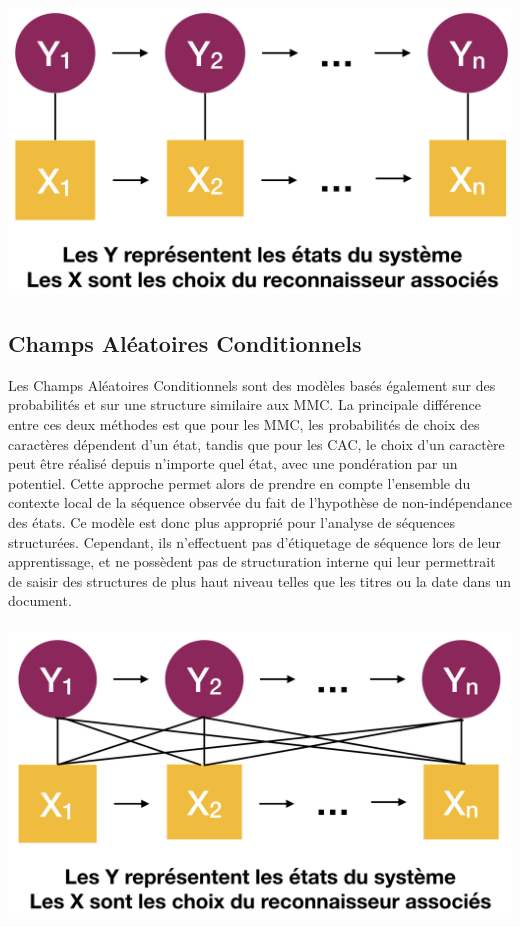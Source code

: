 \paragraph{}
\begin{mdframed}[frametitle={Schéma de transition et d'observation d'un MMC}, innerbottommargin=10]
\begin{center}
\includegraphics[width=0.6\linewidth]{mmc.png}
\end{center}
\end{mdframed}

\subsection{Champs Aléatoires Conditionnels}

Les Champs Aléatoires Conditionnels sont des modèles basés également sur des probabilités et
sur une structure similaire aux MMC. La principale différence entre ces deux méthodes est que pour les MMC,
les probabilités de choix des caractères dépendent d'un état, tandis que pour les CAC, le choix d'un
caractère peut être réalisé depuis n'importe quel état, avec une pondération par un potentiel.
Cette approche permet alors de prendre en compte l'ensemble du contexte local de la séquence observée
du fait de l'hypothèse de non-indépendance des états. Ce modèle est donc plus approprié pour l'analyse de
séquences structurées. Cependant, ils n'effectuent pas d'étiquetage de séquence lors de leur apprentissage,
et ne possèdent pas de structuration interne qui leur permettrait de saisir des structures de plus haut
niveau telles que les titres ou la date dans un document.

\paragraph{}
\begin{mdframed}[frametitle={Schéma de transition et d'observation d'un CAC}, innerbottommargin=10]
\begin{center}
\includegraphics[width=0.6\linewidth]{cac.png}
\end{center}
\end{mdframed}

